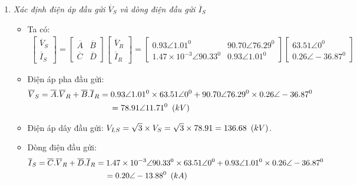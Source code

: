 \begin{enumerate}
\begin{enumerate}[\it a.]
				\item \emph{Xác định điện áp đầu gửi $\overline{V}_S$ và dòng điện đầu gửi $\overline{I}_S$}
					\begin{itemize}
						\item Ta có: 
							\begin{align*}
								\left[{\begin{array}{c}
								\overline{V}_S\\
								\overline{I}_S
								\end{array}
								}\right]
								= 
								\left[{\begin{array}{cc}
								\overline{A} & \overline{B}\\
								\overline{C} & \overline{D}
								\end{array}
								}\right]				
							\left[{\begin{array}{c}
							\overline{V}_R\\
							\overline{I}_R
							\end{array}
							}\right]
							= \left[{\begin{array}{cc}
								0.93 \angle 1.01^0 & 90.70 \angle 76.29^0\\
								1.47 \times 10^{-3} \angle 90.33^0 &  0.93 \angle 1.01^0
								\end{array}
								}\right]				
							\left[{\begin{array}{c}
							63.51 \angle 0^0\\
							0.26 \angle -36.87^0
							\end{array}
							}\right]
						\end{align*}
						
						\item Điện áp pha đầu gửi:
							\begin{align*}
								\overline{V}_S & = \overline{A}. \overline{V}_R + \overline{B}.\overline{I}_R = 0.93 \angle 1.01^0\times 63.51 \angle 0^0+ 90.70 \angle 76.29^0 \times 0.26 \angle -36.87^0 \\
								& \hspace{3cm}= 78.91 \angle 11.71^0 \unitp{kV}
							\end{align*}
							
						\item Điện áp dây đầu gửi: $V_{LS} = \sqrt{3} \times V_S = \sqrt{3} \times 78.91 = 136.68 ~\left({kV}\right)$.
						\item Dòng điện đầu gửi:
							\begin{align*}						
								\overline{I}_S & = \overline{C}. \overline{V}_R + \overline{D}.\overline{I}_R= 1.47 \times 10^{-3} \angle 90.33^0 \times 63.51 \angle 0^0 + 0.93 \angle 1.01^0 \times 0.26 \angle -36.87^0 \\ 
								&\hspace{3cm} = 0.20 \angle -13.88^0 \unitp{kA}
							\end{align*}
					\end{itemize}					
				

\end{enumerate}
\end{enumerate}
